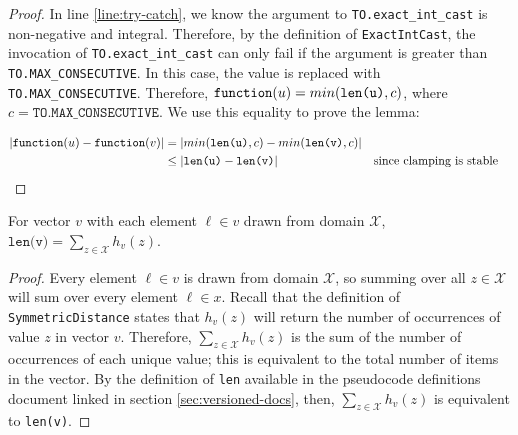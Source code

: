 \documentclass{article}
\begin{document}
\begin{proof}
    In line \ref{line:try-catch}, we know the argument to \texttt{TO.exact\_int\_cast} is non-negative and integral.
    Therefore, by the definition of \texttt{ExactIntCast}, the invocation of \texttt{TO.exact\_int\_cast} can only fail if the argument is greater than \texttt{TO.MAX\_CONSECUTIVE}.
    In this case, the value is replaced with \texttt{TO.MAX\_CONSECUTIVE}.
    Therefore, $\texttt{function}(u) = min(\texttt{len(u)}, c)$, where $c = \texttt{TO.MAX\_CONSECUTIVE}$.
    We use this equality to prove the lemma:

    \begin{align*}
        |\texttt{function}(u) - \texttt{function}(v)| &= |min(\texttt{len(u)}, c) - min(\texttt{len(v)}, c)| \\
        &\leq |\texttt{len(u)} - \texttt{len(v)}| &&\text{since clamping is stable} \\
    \end{align*}
\end{proof}

\begin{lemma}
    \label{lemma:len-sum-equiv}
    For vector $v$ with each element $\ell\in v$ drawn from domain $\mathcal{X}$, $\texttt{len(v)} = \sum_{z\in\mathcal{X}} h_v(z)$.
\end{lemma}

\begin{proof}
    Every element $\ell \in v$ is drawn from domain $\mathcal{X}$, so summing over all $z\in \mathcal{X}$ will sum over every element $\ell\in x$. 
    Recall that the definition of \texttt{SymmetricDistance} states that $h_v(z)$ will return the number of occurrences of value $z$ in vector $v$.
    Therefore, $\sum_{z\in\mathcal{X}} h_v(z)$ is the sum of the number of occurrences of each unique value; 
    this is equivalent to the total number of items in the vector. 
    By the definition of \texttt{len} available in the pseudocode definitions document linked in section \ref{sec:versioned-docs}, 
    then, $\sum_{z\in\mathcal{X}} h_v(z)$ is equivalent to \texttt{len(v)}.
\end{proof}
\end{document}
